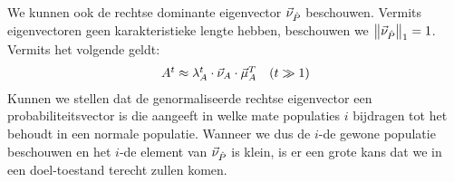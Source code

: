 \paragraph{}

We kunnen ook de rechtse dominante eigenvector $\evr[\hat{P}]$ beschouwen. Vermits eigenvectoren geen karakteristieke lengte hebben, beschouwen we $\dabs[1]{\evr[\hat{P}]}=1$. Vermits het volgende geldt:
\begin{equation}
\conditional{A^t\approx\ev[A]^t\cdot\evr[A]\cdot\evl[A]^T}{$t\gg1$}
\end{equation}
Kunnen we stellen dat de genormaliseerde rechtse eigenvector een probabiliteitsvector is die aangeeft in welke mate populaties $i$ bijdragen tot het behoudt in een normale populatie. Wanneer we dus de $i$-de gewone populatie beschouwen en het $i$-de element van $\evr[\hat{P}]$ is klein, is er een grote kans dat we in een doel-toestand terecht zullen komen.

\paragraph{}


